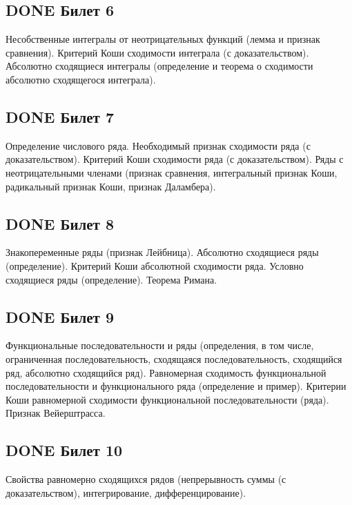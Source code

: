 \documentclass[11pt]{article}
\begin{document}
\subsection{{\bfseries\sffamily DONE} Билет 6}
\label{sec:org1bc8e75}
Несобственные интегралы от неотрицательных функций (лемма и признак сравнения). Критерий Коши сходимости интеграла (с доказательством). Абсолютно сходящиеся интегралы (определение и теорема о сходимости абсолютно сходящегося интеграла).

\subsection{{\bfseries\sffamily DONE} Билет 7}
\label{sec:org43363d1}
Определение числового ряда. Необходимый признак сходимости ряда (с доказательством). Критерий Коши сходимости ряда (с доказательством). Ряды с неотрицательными членами (признак сравнения, интегральный признак Коши, радикальный признак Коши, признак Даламбера).


\subsection{{\bfseries\sffamily DONE} Билет 8}
\label{sec:org65e841f}
Знакопеременные ряды (признак Лейбница). Абсолютно сходящиеся ряды (определение). Критерий Коши абсолютной сходимости ряда. Условно сходящиеся ряды (определение). Теорема Римана.


\subsection{{\bfseries\sffamily DONE} Билет 9}
\label{sec:orgeb0f234}
Функциональные последовательности  и ряды (определения, в том числе, ограниченная последовательность, сходящаяся последовательность, сходящийся ряд, абсолютно сходящийся ряд). Равномерная сходимость функциональной последовательности и функционального ряда (определение и пример). Критерии Коши равномерной сходимости функциональной последовательности (ряда). Признак Вейерштрасса.


\subsection{{\bfseries\sffamily DONE} Билет 10}
\label{sec:orgf38e397}
Свойства равномерно сходящихся рядов (непрерывность суммы (с доказательством), интегрирование, дифференцирование).

\end{document}
